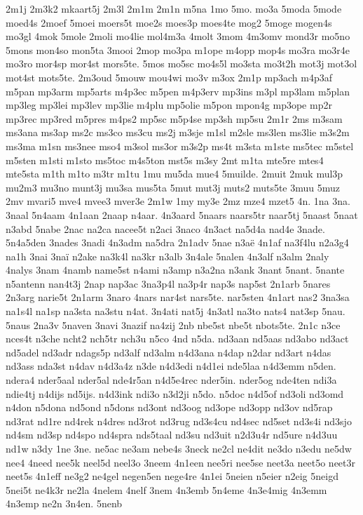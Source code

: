 {2m1j
2m3k2
mkaart5j
2m3l
2m1m
2m1n
m5na
1mo
5mo.
mo3a
5moda
5mode
moed4s
2moef
5moei
moers5t
moe2s
moes3p
moes4te
mog2
5moge
mogen4s
mo3gl
4mok
5mole
2moli
mo4lie
mol4m3a
4molt
3mom
4m3omv
mond3r
mo5no
5mons
mon4so
mon5ta
3mooi
2mop
mo3pa
m1ope
m4opp
mop4s
mo3ra
mo3r4e
mo3ro
mor4sp
mor4st
mors5te.
5mos
mo5sc
mo4s5l
mo3sta
mo3t2h
mot3j
mot3ol
mot4st
mots5te.
2m3oud
5mouw
mou4wi
mo3v
m3ox
2m1p
mp3ach
m4p3af
m5pan
mp3arm
mp5arts
m4p3ec
m5pen
m4p3erv
mp3ins
m3pl
mp3lam
m5plan
mp3leg
mp3lei
mp3lev
mp3lie
m4plu
mp5olie
m5pon
mpon4g
mp3ope
mp2r
mp3rec
mp3red
m5pres
m4ps2
mp5sc
m5p4se
mp3sh
mp5su
2m1r
2ms
m3sam
ms3ana
ms3ap
ms2c
ms3co
ms3cu
ms2j
m3sje
m1sl
m2sle
ms3len
ms3lie
m3s2m
ms3ma
m1sn
ms3nee
mso4
m3sol
ms3or
m3s2p
ms4t
m3sta
m1ste
ms5tec
m5stel
m5sten
m1sti
m1sto
ms5toc
m4s5ton
mst5s
m3sy
2mt
m1ta
mte5re
mtes4
mte5sta
m1th
m1to
m3tr
m1tu
1mu
mu5da
mue4
5muilde.
2muit
2muk
mul3p
mu2m3
mu3no
munt3j
mu3sa
mus5ta
5mut
mut3j
muts2
muts5te
3muu
5muz
2mv
mvari5
mve4
mvee3
mver3e
2m1w
1my
my3e
2mz
mze4
mzet5
4n.
1na
3na.
3naal
5n4aam
4n1aan
2naap
n4aar.
4n3aard
5naars
naars5tr
naar5tj
5naast
5naat
n3abd
5nabe
2nac
na2ca
nacee5t
n2aci
3naco
4n3act
na5d4a
nad4e
3nade.
5n4a5den
3nades
3nadi
4n3adm
na5dra
2n1adv
5nae
n3aë
4n1af
na3f4lu
n2a3g4
na1h
3nai
3naï
n2ake
na3k4l
na3kr
n3alb
3n4ale
5nalen
4n3alf
n3alm
2naly
4nalys
3nam
4namb
name5st
n4ami
n3amp
n3a2na
n3ank
3nant
5nant.
5nante
n5antenn
nan4t3j
2nap
nap3ac
3na3p4l
na3p4r
nap3s
nap5st
2n1arb
5nares
2n3arg
narie5t
2n1arm
3naro
4nars
nar4st
nars5te.
nar5sten
4n1art
nas2
3na3sa
na1s4l
na1sp
na3sta
na3stu
n4at.
3n4ati
nat5j
4n3atl
na3to
nats4
nat3sp
5nau.
5naus
2na3v
5naven
3navi
3nazif
na4zij
2nb
nbe5st
nbe5t
nbots5te.
2n1c
n3ce
nces4t
n3che
ncht2
nch5tr
nch3u
n5co
4nd
n5da.
nd3aan
nd5aas
nd3abo
nd3act
nd5adel
nd3adr
ndags5p
nd3alf
nd3alm
n4d3ana
n4dap
n2dar
nd3art
n4das
nd3ass
nda3st
n4dav
n4d3a4z
n3de
n4d3edi
n4d1ei
nde5laa
n4d3emm
n5den.
ndera4
nder5aal
nder5al
nde4r5an
n4d5e4rec
nder5in.
nder5og
nde4ten
ndi3a
ndie4tj
n4dijs
nd5ijs.
n4d3ink
ndi3o
n3d2ji
n5do.
n5doc
n4d5of
nd3oli
nd3omd
n4don
n5dona
nd5ond
n5dons
nd3ont
nd3oog
nd3ope
nd3opp
nd3ov
nd5rap
nd3rat
nd1re
nd4rek
n4dres
nd3rot
nd3rug
nd3s4cu
nd4sec
nd5set
nd3s4i
nd3sjo
nd4sm
nd3sp
nd4spo
nd4spra
nds5taal
nd3su
nd3uit
n2d3u4r
nd5ure
n4d3uu
nd1w
n3dy
1ne
3ne.
ne5ac
ne3am
nebe4s
3neck
ne2cl
ne4dit
ne3do
n3edu
ne5dw
nee4
4need
nee5k
neel5d
neel3o
3neem
4n1een
nee5ri
nee5se
neet3a
neet5o
neet3r
neet5s
4n1eff
ne3g2
ne4gel
negen5en
nege4re
4n1ei
5neien
n5eier
n2eig
5neigd
5nei5t
ne4k3r
ne2la
4nelem
4nelf
3nem
4n3emb
5n4eme
4n3e4mig
4n3emm
4n3emp
ne2n
3n4en.
5nenb
}
